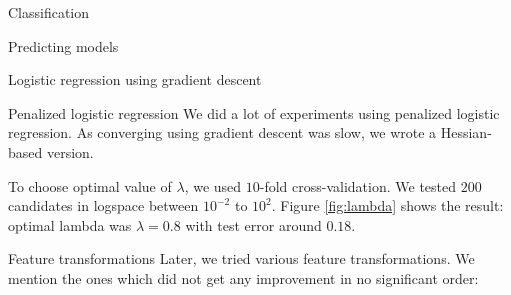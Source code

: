 \documentclass{article}
\begin{document}
\begin{section}{Classification}
\begin{subsection}{Predicting models}
\begin{subsubsection}{Logistic regression using gradient descent}
\end{subsubsection}
\begin{subsubsection}{Penalized logistic regression}
We did a lot of experiments using penalized logistic regression. As converging using gradient descent was slow, we wrote a Hessian-based version.

To choose optimal value of $\lambda$, we used $10$-fold cross-validation. We tested $200$ candidates in logspace between $10^{-2}$ to $10^2$. Figure \ref{fig:lambda} shows the result: optimal lambda was $\lambda = 0.8$ with test error around $0.18$.

\begin{figure}[!t]
\center

\hfill
{}
\caption{}
\end{figure}

\begin{subsubsection}{Feature transformations}
Later, we tried various feature transformations. We mention the ones which did not get any improvement in no significant order:
\begin{itemize}


\end{itemize}
\end{subsubsection}
\end{subsubsection}
\end{subsection}
\end{section}
\end{document}
